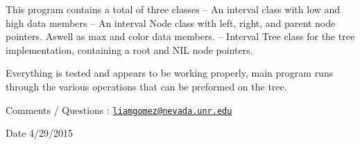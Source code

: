 This program contains a total of three classes -- An interval class with low and high data members -- An interval Node class with left, right, and parent node pointers. Aswell as max and color data members. -- Interval Tree class for the tree implementation, containing a root and N\-I\-L node pointers.

Everything is tested and appears to be working properly, main program runs through the various operations that can be preformed on the tree.

Comments / Questions \-: \href{mailto:liamgomez@nevada.unr.edu}{\tt liamgomez@nevada.\-unr.\-edu}

\begin{DoxyDate}{Date}
4/29/2015 
\end{DoxyDate}
